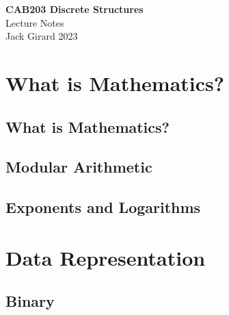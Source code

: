 \documentclass{article}
\begin{document}
    \begin{titlepage}
        \begin{center}
            \LARGE{\textbf{CAB203 Discrete Structures}} \\[0.2in]
            \LARGE{Lecture Notes} \\[0.1in]
            \large{Jack Girard 2023}
        \end{center}
    \end{titlepage}
    
    \newpage

    \tableofcontents
    \newpage

    \section{What is Mathematics?}
        \subsection{What is Mathematics?}
        \subsection{Modular Arithmetic}
        \subsection{Exponents and Logarithms}

    \section{Data Representation}
        \subsection{Binary}
\end{document}
